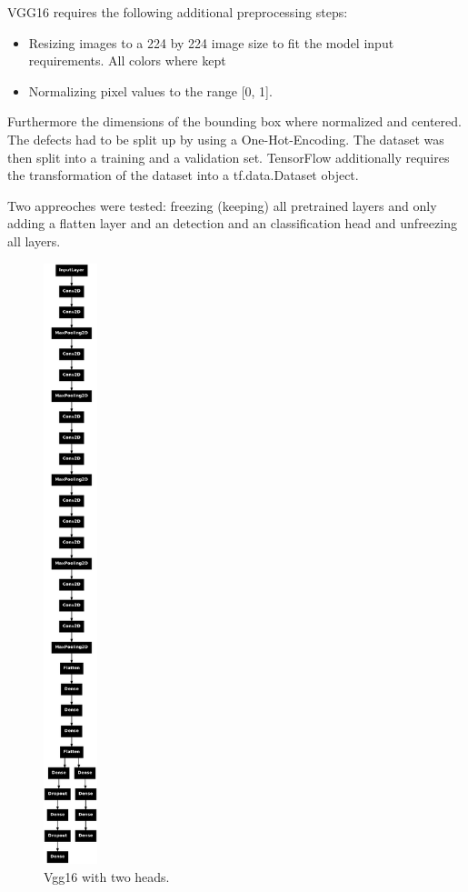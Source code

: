 \documentclass[12pt]{article}
\begin{document}
VGG16 requires the following additional preprocessing steps: 

\begin{itemize}
    \item Resizing images to a 224 by 224 image size to fit the model input requirements. All colors where kept
    \item Normalizing pixel values to the range [0, 1].  
\end{itemize}

Furthermore the dimensions of the bounding box where normalized and centered. The defects had to be split up by using a One-Hot-Encoding. The dataset was then split into a training and a validation set. 
TensorFlow additionally requires the transformation of the dataset into a tf.data.Dataset object.

Two appreoches were tested: freezing (keeping) all pretrained layers and only adding a flatten layer and an detection and an classification head and unfreezing all layers.

\begin{figure}[h]
    \centering
    \includegraphics[width=0.14\textwidth]{./graphics/3.png}
    \caption{Vgg16 with two heads.}
\end{figure}
\end{document}
